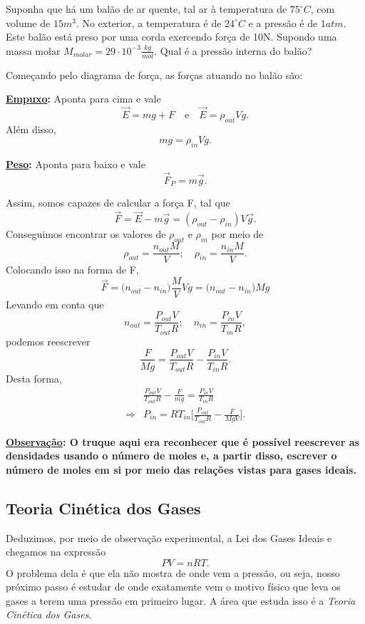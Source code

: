\documentclass[phsyicsII_notes.tex]{subfiles}
\begin{document}
\begin{example}
	Suponha que há um balão de ar quente, tal ar à temperatura de \(75^{\circ{}}C\), com volume de \(15m^{3}\).
	No exterior, a temperatura é de \(24^{\circ{}}C\) e a pressão é de \(1atm\). Este balão está preso por uma corda exercendo
	força de 10N. Supondo uma massa molar \(M_{molar} = 29 \cdot 10^{-3}\frac{kg}{mol}\). Qual é a pressão interna do balão?

	Começando pelo diagrama de força, as forças atuando no balão são:

	\textbf{\underline{Empuxo}:}
	Aponta para cima e vale
	\[
		\vec{E} = mg + F\quad\text{e}\quad \vec{E} = \rho_{out} Vg.
	\]
	Além disso,
	\[
		mg = \rho_{in}Vg.
	\]

	\textbf{\underline{Peso}:}
	Aponta para baixo e vale
	\[
		\vec{F}_{P} = m \vec{g}.
	\]

	Assim, somos capazes de calcular a força F, tal que
	\[
		\vec{F} = \vec{E} - m \vec{g} = (\rho_{out}-\rho_{in})V \vec{g}.
	\]
	Conseguimos encontrar os valores de \(\rho_{out}\) e \(\rho_{in}\) por meio de
	\[
		\rho_{out} = \frac{n_{out}M}{V};\quad \rho_{in} = \frac{n_{in}M}{V}.
	\]
	Colocando isso na forma de F,
	\[
		\vec{F} = \biggl(n_{out}-n_{in}\biggr)\frac{M}{V}Vg = \biggl(n_{out}-n_{in}\biggr)Mg
	\]
	Levando em conta que
	\[
		n_{out} = \frac{P_{out}V}{T_{out}R};\quad n_{in} = \frac{P_{in}V}{T_{in}R},
	\]
	podemos reescrever
	\[
		\frac{F}{Mg} = \frac{P_{out}V}{T_{out}R} - \frac{P_{in}V}{T_{in}R}.
	\]
	Desta forma,
	\begin{align*}
		            & \frac{P_{out}V}{T_{out}R} - \frac{F}{mg} = \frac{P_{in}V}{T_{in}R}      \\
		\Rightarrow & P_{in} = RT_{in}\biggl[\frac{P_{out}}{T_{out}R} - \frac{F}{MgV}\biggr].
	\end{align*}

	\textbf{\underline{Observação}: O truque aqui era reconhecer que é possível reescrever as densidades usando o número
		de moles e, a partir disso, escrever o número de moles em si por meio das relações vistas para gases ideais.}
\end{example}
\subsection{Teoria Cinética dos Gases}
Deduzimos, por meio de observação experimental, a Lei dos Gases Ideais e chegamos na expressão
\[
	PV = nRT.
\]
O problema dela é que ela não mostra de onde vem a pressão, ou seja, nosso próximo passo é estudar de onde
exatamente vem o motivo físico que leva os gases a terem uma pressão em primeiro lugar. A área que estuda isso
é a \textit{Teoria Cinética dos Gases}.
\end{document}
